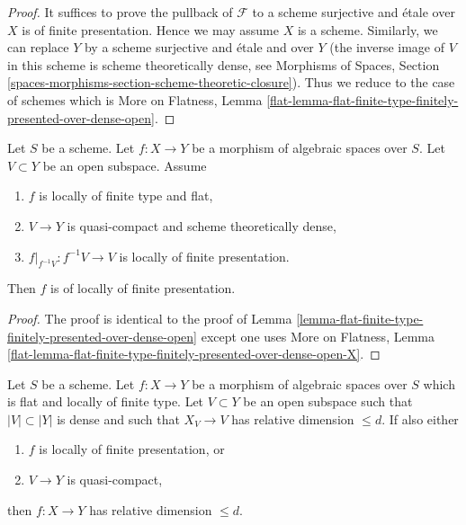 \begin{proof}
It suffices to prove the pullback of $\mathcal{F}$ to a scheme surjective
and \'etale over $X$ is of finite presentation. Hence we may assume $X$
is a scheme. Similarly, we can replace $Y$ by a scheme surjective and
\'etale and over $Y$ (the inverse image of $V$ in this scheme is scheme
theoretically dense, see
Morphisms of Spaces, Section
\ref{spaces-morphisms-section-scheme-theoretic-closure}).
Thus we reduce to the case of schemes which is
More on Flatness, Lemma
\ref{flat-lemma-flat-finite-type-finitely-presented-over-dense-open}.
\end{proof}

\begin{lemma}
\label{lemma-flat-finite-type-finitely-presented-over-dense-open-X}
Let $S$ be a scheme.
Let $f : X \to Y$ be a morphism of algebraic spaces over $S$.
Let $V \subset Y$ be an open subspace.
Assume
\begin{enumerate}
\item $f$ is locally of finite type and flat,
\item $V \to Y$ is quasi-compact and scheme theoretically dense,
\item $f|_{f^{-1}V} : f^{-1}V \to V$ is locally of finite presentation.
\end{enumerate}
Then $f$ is of locally of finite presentation.
\end{lemma}

\begin{proof}
The proof is identical to the proof of
Lemma \ref{lemma-flat-finite-type-finitely-presented-over-dense-open}
except one uses
More on Flatness, Lemma
\ref{flat-lemma-flat-finite-type-finitely-presented-over-dense-open-X}.
\end{proof}

\begin{lemma}
\label{lemma-flat-fp-dimension-over-dense-open}
Let $S$ be a scheme. Let $f : X \to Y$ be a morphism of algebraic spaces
over $S$ which is flat and locally of finite type. Let $V \subset Y$ be an
open subspace such that $|V| \subset |Y|$ is dense and such that $X_V \to V$
has relative dimension $\leq d$. If also either
\begin{enumerate}
\item $f$ is locally of finite presentation, or
\item $V \to Y$ is quasi-compact,
\end{enumerate}
then $f : X \to Y$ has relative dimension $\leq d$.
\end{lemma}


